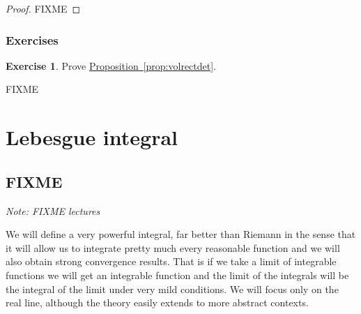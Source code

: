 \documentclass[12pt]{book}
\newcommand{\sectionnotes}[1]{\noindent \emph{Note: #1} \medskip \par}
\theoremstyle{plain}
\newtheorem{cor}[thm]{Corollary}
\theoremstyle{remark}
\theoremstyle{definition}
\theoremstyle{exercise}
\newtheorem{exercise}{Exercise}[section]
\theoremstyle{example}
\newcommand{\propref}[1]{\hyperref[#1]{Proposition~\ref*{#1}}}
\begin{document}
\begin{proof}
FIXME
\end{proof}

%

\subsection{Exercises}

\begin{exercise}
Prove \propref{prop:volrectdet}.
\end{exercise}

FIXME




\chapter{Lebesgue integral} \label{lebesgue:chapter}



\section{FIXME}
\label{sec:FIXME}

\sectionnotes{FIXME lectures}

We will define a very powerful integral, far better than Riemann in the
sense that it will allow us to integrate pretty much every reasonable
function and we will also obtain strong convergence results.  That is
if we take a limit of integrable functions we will get an integrable
function and the limit of the integrals will be the integral of the limit
under very mild conditions.  We will focus only on the real line, although
the theory easily extends to more abstract contexts.
\end{document}
